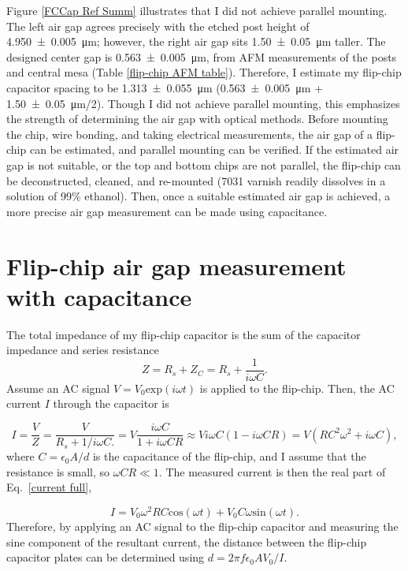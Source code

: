 \documentclass[double,12pt,1in,seploa]{beavtex}
\let\Oldsection\section
\renewcommand{\section}{\FloatBarrier\Oldsection}
\begin{document}
Figure \ref{FCCap Ref Summ} illustrates that I did not achieve parallel mounting. The left air gap agrees precisely with the etched post height of \SI{4.950(5)}{\micro\meter}; however, the right air gap sits \SI{1.50(5)}{\micro\meter} taller. The designed center gap is \SI{0.563(5)}{\micro\meter}, from AFM measurements of the posts and central mesa (Table \ref{flip-chip AFM table}). Therefore, I estimate my flip-chip capacitor spacing to be \SI{1.313(55)}{\micro\meter} (\SI{0.563(5)}{\micro\meter} + \SI{1.50(5)}{\micro\meter}/2). Though I did not achieve parallel mounting, this emphasizes the strength of determining the air gap with optical methods. Before mounting the chip, wire bonding, and taking electrical measurements, the air gap of a flip-chip can be estimated, and parallel mounting can be verified. If the estimated air gap is not suitable, or the top and bottom chips are not parallel, the flip-chip can be deconstructed, cleaned, and re-mounted (7031 varnish readily dissolves in a solution of 99\% ethanol). Then, once a suitable estimated air gap is achieved, a more precise air gap measurement can be made using capacitance.


\section{Flip-chip air gap measurement with capacitance}
The total impedance of my flip-chip capacitor is the sum of the capacitor impedance and series resistance
\begin{equation}
    Z = R_s + Z_C = R_s + \frac{1}{i\omega C}.
\end{equation}
Assume an AC signal $V = V_0 \mathrm{exp}(i\omega t)$ is applied to the flip-chip. Then, the AC current $I$ through the capacitor is 

\begin{equation} \label{current full}
    I = \frac{V}{Z} = \frac{V}{R_s + 1/i\omega C.} = V \frac{i\omega C}{1 + i\omega C R}\approx V i\omega C (1 - i\omega C R) = V(R C^2 \omega ^2 + i\omega C),
\end{equation}
where $C = \epsilon_0 A / d$ is the capacitance of the flip-chip, and I assume that the resistance is small, so $\omega C R \ll 1$. The measured current is then the real part of Eq.\ \ref{current full}, 

\begin{equation}
    I = V_0\omega^2 R C \mathrm{cos}(\omega t) + V_0 C \omega \mathrm{sin}(\omega t).
\end{equation}
Therefore, by applying an AC signal to the flip-chip capacitor and measuring the sine component of the resultant current, the distance between the flip-chip capacitor plates can be determined using $d = 2\pi f \epsilon_0 A V_0 / I$. 
\end{document}
